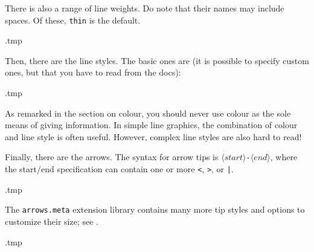 There is also a range of line weights.
Do note that their names may include spaces.
Of these, \verb|thin| is the default.
%
\begin{VerbatimOut}{\jobname.tmp}
\end{VerbatimOut}
\ShowExample

Then, there are the line styles.
The basic ones are (it is possible to specify custom ones, but that you have to read from the docs):
%
\begin{VerbatimOut}{\jobname.tmp}
\end{VerbatimOut}
\ShowExample

\begin{practices}
As remarked in the section on colour,
you should never use colour as the sole means of giving information.
In simple line graphics, the combination of colour and line style is often useful.
However, complex line styles are also hard to read!
\end{practices}


Finally, there are the arrows.
The syntax for arrow tips is $\langle\textit{start}\rangle$\verb|-|$\langle\textit{end}\rangle$,
where the start/end specification can contain one or more \verb|<|, \verb|>|, or \verb$|$.
%
\begin{VerbatimOut}{\jobname.tmp}
\end{VerbatimOut}
\ShowExample
%
The \verb|arrows.meta| extension library contains many more tip styles
and options to customize their size; see \cite[Section~16]{tikz}.
%
\begin{VerbatimOut}{\jobname.tmp}
\end{VerbatimOut}
\ShowExampleBelow

